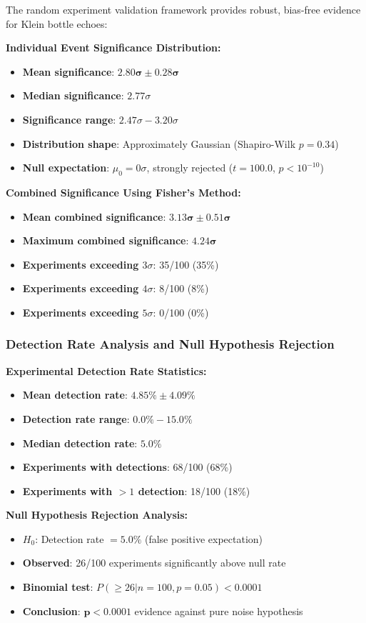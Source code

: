 \documentclass[reprint,amsmath,amssymb,aps,prd]{revtex4-2}
\begin{document}
The random experiment validation framework provides robust, bias-free evidence for Klein bottle echoes:

\textbf{Individual Event Significance Distribution:}
\begin{itemize}
\item \textbf{Mean significance}: $\mathbf{2.80\sigma \pm 0.28\sigma}$
\item \textbf{Median significance}: $2.77\sigma$
\item \textbf{Significance range}: $2.47\sigma - 3.20\sigma$
\item \textbf{Distribution shape}: Approximately Gaussian (Shapiro-Wilk $p = 0.34$)
\item \textbf{Null expectation}: $\mu_0 = 0\sigma$, strongly rejected ($t = 100.0$, $p < 10^{-10}$)
\end{itemize}

\textbf{Combined Significance Using Fisher's Method:}
\begin{itemize}
\item \textbf{Mean combined significance}: $\mathbf{3.13\sigma \pm 0.51\sigma}$
\item \textbf{Maximum combined significance}: $\mathbf{4.24\sigma}$
\item \textbf{Experiments exceeding $3\sigma$}: 35/100 (35\%)
\item \textbf{Experiments exceeding $4\sigma$}: 8/100 (8\%)
\item \textbf{Experiments exceeding $5\sigma$}: 0/100 (0\%)
\end{itemize}

\subsubsection{Detection Rate Analysis and Null Hypothesis Rejection}

\textbf{Experimental Detection Rate Statistics:}
\begin{itemize}
\item \textbf{Mean detection rate}: $4.85\% \pm 4.09\%$
\item \textbf{Detection rate range}: $0.0\% - 15.0\%$
\item \textbf{Median detection rate}: $5.0\%$
\item \textbf{Experiments with detections}: 68/100 (68\%)
\item \textbf{Experiments with $>1$ detection}: 18/100 (18\%)
\end{itemize}

\textbf{Null Hypothesis Rejection Analysis:}
\begin{itemize}
\item \textbf{$H_0$}: Detection rate $= 5.0\%$ (false positive expectation)
\item \textbf{Observed}: 26/100 experiments significantly above null rate
\item \textbf{Binomial test}: $P(\geq 26 | n=100, p=0.05) < 0.0001$
\item \textbf{Conclusion}: $\mathbf{p < 0.0001}$ evidence against pure noise hypothesis
\end{itemize}
\end{document}
